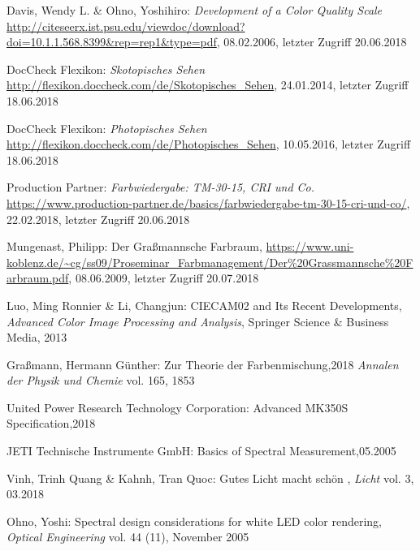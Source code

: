 \begin{thebibliography}{}
Davis, Wendy L. \& Ohno, Yoshihiro:
\emph{\glqq Development of a Color Quality Scale\grqq}
\url{http://citeseerx.ist.psu.edu/viewdoc/download?doi=10.1.1.568.8399&rep=rep1&type=pdf}, 08.02.2006, letzter Zugriff 20.06.2018

DocCheck Flexikon:
\emph{\glqq Skotopisches Sehen\grqq}
\url{http://flexikon.doccheck.com/de/Skotopisches_Sehen}, 24.01.2014, letzter Zugriff 18.06.2018

DocCheck Flexikon:
\emph{\glqq Photopisches Sehen\grqq}
\url{http://flexikon.doccheck.com/de/Photopisches_Sehen}, 10.05.2016, letzter Zugriff 18.06.2018

Production Partner:
\emph{\glqq Farbwiedergabe: TM-30-15, CRI und Co.\grqq}
\url{https://www.production-partner.de/basics/farbwiedergabe-tm-30-15-cri-und-co/}, 22.02.2018, letzter Zugriff 20.06.2018

Mungenast, Philipp:
\glqq Der Graßmannsche Farbraum\grqq ,
\url{https://www.uni-koblenz.de/~cg/ss09/Proseminar_Farbmanagement/Der\%20Grassmannsche\%20Farbraum.pdf}, 08.06.2009, letzter Zugriff 20.07.2018


Luo, Ming Ronnier \& Li, Changjun:
\glqq CIECAM02 and Its Recent Developments\grqq ,
\emph{Advanced Color Image Processing and Analysis}, Springer Science \& Business Media, 2013

Graßmann, Hermann Günther:
\glqq Zur Theorie der Farbenmischung\grqq ,2018
\emph{Annalen der Physik und Chemie} vol. 165, 1853

United Power Research Technology Corporation:
\glqq Advanced MK350S Specification\grqq ,2018


JETI Technische Instrumente GmbH:
\glqq Basics of Spectral Measurement\grqq ,05.2005

Vinh, Trinh Quang \& Kahnh, Tran Quoc:
\glqq Gutes Licht macht schön \grqq, 
\emph{Licht} vol. 3, 03.2018

Ohno, Yoshi:
\glqq Spectral design considerations for white LED color rendering\grqq, 
\emph{Optical Engineering} vol. 44 (11), November 2005


\end{thebibliography}

